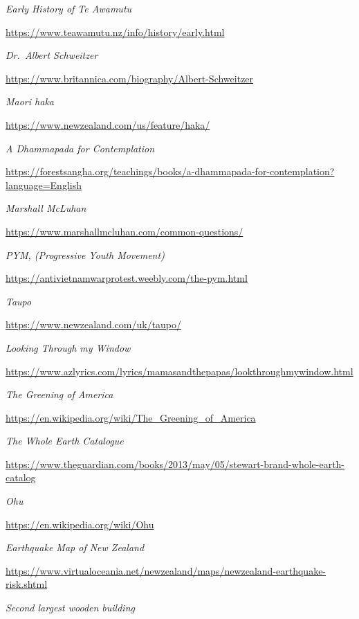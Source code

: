 \begin{thebibliography}{9}

 \emph{Early History of Te Awamutu}

  {\urlsize \url{https://www.teawamutu.nz/info/history/early.html}}

 \emph{Dr.~Albert Schweitzer}

  {\urlsize \url{https://www.britannica.com/biography/Albert-Schweitzer}}

 \emph{Maori haka}

  {\urlsize \url{https://www.newzealand.com/us/feature/haka/}}

 \emph{A Dhammapada for Contemplation}

  {\urlsize \url{https://forestsangha.org/teachings/books/a-dhammapada-for-contemplation?language=English}}

 \emph{Marshall McLuhan}

  {\urlsize \url{https://www.marshallmcluhan.com/common-questions/}}

 \emph{PYM, (Progressive Youth Movement)}

  {\urlsize \url{https://antivietnamwarprotest.weebly.com/the-pym.html}}

 \emph{Taupo}

  {\urlsize \url{https://www.newzealand.com/uk/taupo/}}

 \emph{Looking Through my Window}

  {\urlsize \url{https://www.azlyrics.com/lyrics/mamasandthepapas/lookthroughmywindow.html}}

 \emph{The Greening of America}

  {\urlsize \url{https://en.wikipedia.org/wiki/The_Greening_of_America}}
 
 \emph{The Whole Earth Catalogue}

  {\urlsize \url{https://www.theguardian.com/books/2013/may/05/stewart-brand-whole-earth-catalog}}

 \emph{Ohu}

  {\urlsize \url{https://en.wikipedia.org/wiki/Ohu}}

 \emph{Earthquake Map of New Zealand}

  {\urlsize \url{https://www.virtualoceania.net/newzealand/maps/newzealand-earthquake-risk.shtml}}

 \emph{Second largest wooden building}


\end{thebibliography}
